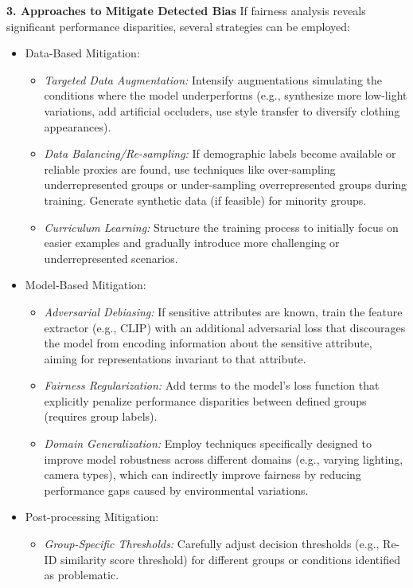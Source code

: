 \textbf{3. Approaches to Mitigate Detected Bias}
If fairness analysis reveals significant performance disparities, several strategies can be employed:
\begin{itemize}
    \item Data-Based Mitigation:
    \begin{itemize}
        \item \textit{Targeted Data Augmentation:} Intensify augmentations simulating the conditions where the model underperforms (e.g., synthesize more low-light variations, add artificial occluders, use style transfer to diversify clothing appearances).
        \item \textit{Data Balancing/Re-sampling:} If demographic labels become available or reliable proxies are found, use techniques like over-sampling underrepresented groups or under-sampling overrepresented groups during training. Generate synthetic data (if feasible) for minority groups.
        \item \textit{Curriculum Learning:} Structure the training process to initially focus on easier examples and gradually introduce more challenging or underrepresented scenarios.
    \end{itemize}
    \item Model-Based Mitigation:
    \begin{itemize}
        \item \textit{Adversarial Debiasing:} If sensitive attributes are known, train the feature extractor (e.g., CLIP) with an additional adversarial loss that discourages the model from encoding information about the sensitive attribute, aiming for representations invariant to that attribute.
        \item \textit{Fairness Regularization:} Add terms to the model's loss function that explicitly penalize performance disparities between defined groups (requires group labels).
        \item \textit{Domain Generalization:} Employ techniques specifically designed to improve model robustness across different domains (e.g., varying lighting, camera types), which can indirectly improve fairness by reducing performance gaps caused by environmental variations.
    \end{itemize}
    \item Post-processing Mitigation:
    \begin{itemize}
        \item \textit{Group-Specific Thresholds:} Carefully adjust decision thresholds (e.g., Re-ID similarity score threshold) for different groups or conditions identified as problematic.

\end{itemize}
\end{itemize}
